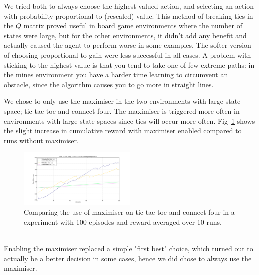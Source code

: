 We tried both to always choose
the highest valued action, and selecting an action with probability proportional
to (rescaled) value. This method of breaking ties in the $Q$ matrix proved useful
in board game environments  where the number of states were large, but for the
other environments, it didn't add any benefit and actually caused the agent to
perform worse in some examples. The softer version of choosing proportional to
gain were less successful in all cases. A problem with sticking to the highest
value is that you tend to take one of few extreme paths: in the mines
environment you have a harder time learning to circumvent an obstacle, since
the algorithm causes you to go more in straight lines.



We chose to only use the maximiser in the two environments with large state
space; tic-tac-toe and connect four. The maximiser is triggered more often in
environments with large state spaces since ties will occur more often.
Fig~\ref{fig:tiemaximiser} shows the slight increase in cumulative reward with
maximiser enabled compared to runs without maximiser.
\begin{figure}[h]
    \centering
    \includegraphics[width=0.5\textwidth]{../data/tiebreakerplotconnectfourtictactoe.png}
    \caption{Comparing the use of maximiser on tic-tac-toe and connect four in a experiment with 100 episodes and reward averaged over 10 runs. }
    \label{fig:tiemaximiser}
\end{figure}\\
Enabling the maximiser replaced a simple "first best" choice, which turned out
to actually be a better decision in some cases, hence we did chose to always use
the maximiser.

